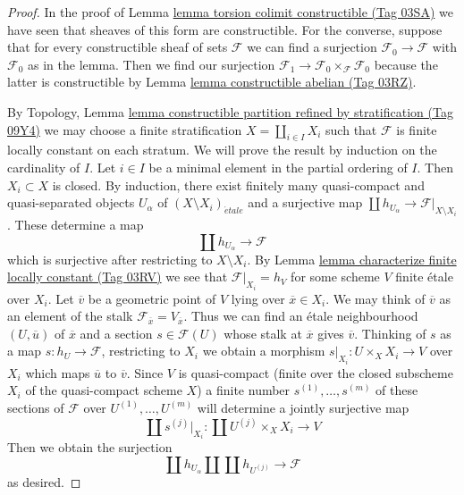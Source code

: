 \documentclass{amsart}
\theoremstyle{plain}
\theoremstyle{definition}
\theoremstyle{remark}
\numberwithin{equation}{subsection}
\def\etale{{\acute{e}tale}}
\begin{document}
\begin{proof}
In the proof of Lemma \href{https://stacks.math.columbia.edu/tag/03SA}{lemma torsion colimit constructible (Tag 03SA)}
we have seen that sheaves of this form are constructible.
For the converse, suppose that for every constructible sheaf of
sets $\mathcal{F}$ we can find a surjection $\mathcal{F}_0 \to \mathcal{F}$
with $\mathcal{F}_0$ as in the lemma. Then we find our surjection
$\mathcal{F}_1 \to \mathcal{F}_0 \times_\mathcal{F} \mathcal{F}_0$
because the latter is constructible by Lemma \href{https://stacks.math.columbia.edu/tag/03RZ}{lemma constructible abelian (Tag 03RZ)}.

\medskip\noindent
By Topology, Lemma
\href{https://stacks.math.columbia.edu/tag/09Y4}{lemma constructible partition refined by stratification (Tag 09Y4)}
we may choose a finite stratification
$X = \coprod_{i \in I} X_i$ such that $\mathcal{F}$ is finite locally
constant on each stratum. We will prove the result by induction on
the cardinality of $I$. Let $i \in I$ be a minimal element in the
partial ordering of $I$. Then $X_i \subset X$ is closed.
By induction, there exist finitely many quasi-compact and quasi-separated
objects $U_\alpha$ of $(X \setminus X_i)_\etale$ and a surjective
map $\coprod h_{U_\alpha} \to \mathcal{F}|_{X \setminus X_i}$.
These determine a map
$$
\coprod h_{U_\alpha} \to \mathcal{F}
$$
which is surjective after restricting to $X \setminus X_i$. By
Lemma \href{https://stacks.math.columbia.edu/tag/03RV}{lemma characterize finite locally constant (Tag 03RV)}
we see that $\mathcal{F}|_{X_i} = h_V$ for some scheme $V$ finite \'etale
over $X_i$. Let $\overline{v}$ be a geometric point of $V$ lying
over $\overline{x} \in X_i$. We may think of $\overline{v}$ as an
element of the stalk $\mathcal{F}_{\overline{x}} = V_{\overline{x}}$.
Thus we can find an \'etale neighbourhood $(U, \overline{u})$
of $\overline{x}$ and a section $s \in \mathcal{F}(U)$ whose stalk at
$\overline{x}$ gives $\overline{v}$. Thinking of $s$ as a map
$s : h_U \to \mathcal{F}$, restricting to $X_i$ we obtain a morphism
$s|_{X_i} : U \times_X X_i \to V$ over $X_i$ which maps $\overline{u}$
to $\overline{v}$. Since $V$ is quasi-compact (finite over the closed
subscheme $X_i$ of the quasi-compact scheme $X$) a finite number
$s^{(1)}, \ldots, s^{(m)}$ of these sections of $\mathcal{F}$ over
$U^{(1)}, \ldots, U^{(m)}$ will determine a jointly
surjective map
$$
\coprod s^{(j)}|_{X_i} : \coprod U^{(j)} \times_X X_i \longrightarrow V
$$
Then we obtain the surjection
$$
\coprod h_{U_\alpha} \amalg \coprod h_{U^{(j)}} \to \mathcal{F}
$$
as desired.
\end{proof}
\end{document}
